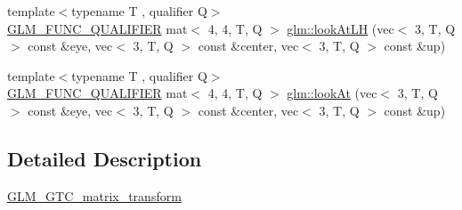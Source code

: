 \begin{DoxyCompactItemize}
{\footnotesize template$<$typename T , qualifier Q$>$ }\\\hyperlink{setup_8hpp_a33fdea6f91c5f834105f7415e2a64407}{G\+L\+M\+\_\+\+F\+U\+N\+C\+\_\+\+Q\+U\+A\+L\+I\+F\+I\+ER} mat$<$ 4, 4, T, Q $>$ \hyperlink{group__gtc__matrix__transform_gab2c09e25b0a16d3a9d89cc85bbae41b0}{glm\+::look\+At\+LH} (vec$<$ 3, T, Q $>$ const \&eye, vec$<$ 3, T, Q $>$ const \&center, vec$<$ 3, T, Q $>$ const \&up)
\item 
{\footnotesize template$<$typename T , qualifier Q$>$ }\\\hyperlink{setup_8hpp_a33fdea6f91c5f834105f7415e2a64407}{G\+L\+M\+\_\+\+F\+U\+N\+C\+\_\+\+Q\+U\+A\+L\+I\+F\+I\+ER} mat$<$ 4, 4, T, Q $>$ \hyperlink{group__gtc__matrix__transform_gaa64aa951a0e99136bba9008d2b59c78e}{glm\+::look\+At} (vec$<$ 3, T, Q $>$ const \&eye, vec$<$ 3, T, Q $>$ const \&center, vec$<$ 3, T, Q $>$ const \&up)
\end{DoxyCompactItemize}


\subsection{Detailed Description}
\hyperlink{group__gtc__matrix__transform}{G\+L\+M\+\_\+\+G\+T\+C\+\_\+matrix\+\_\+transform} 